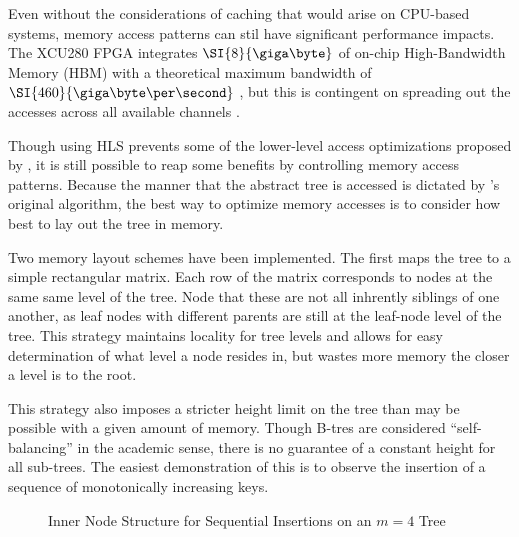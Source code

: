 \begin{figure}[H]
	\centering
	
\end{figure}

\begin{figure}[H]
	\centering
	
\end{figure}



Even without the considerations of caching that would arise on CPU-based
systems, memory access patterns can stil have significant performance impacts.
The XCU280 FPGA integrates $\SI{8}{\giga\byte}$ of on-chip High-Bandwidth Memory
(HBM) with a theoretical maximum bandwidth of $\SI{460}{\giga\byte\per\second}$
\autocite{u280}, but this is contingent on spreading out the accesses across all
available channels \autocite{holzinger-ipdpsw-2021}.

Though using HLS prevents some of the lower-level access optimizations proposed
by \citeauthor{holzinger-ipdpsw-2021}, it is still possible to reap some
benefits by controlling memory access patterns. Because the manner that the
abstract tree is accessed is dictated by \citeauthor{b-link}'s original
algorithm, the best way to optimize memory accesses is to consider how best to
lay out the tree in memory.


\begin{figure}[H]
	\centering
	
\end{figure}

Two memory layout schemes have been implemented. The first maps the tree to a
simple rectangular matrix. Each row of the matrix corresponds to nodes at the
same same level of the tree. Node that these are not all inhrently siblings of
one another, as leaf nodes with different parents are still at the leaf-node
level of the tree. This strategy maintains locality for tree levels and allows
for easy determination of what level a node resides in, but wastes more memory
the closer a level is to the root.

This strategy also imposes a stricter height limit on the tree than may be
possible with a given amount of memory. Though B-tres are considered
``self-balancing'' in the academic sense, there is no guarantee of a constant
height for all sub-trees. The easiest demonstration of this is to observe the
insertion of a sequence of monotonically increasing keys.

\begin{figure}[H]
	\centering
	
	\caption{Inner Node Structure for Sequential Insertions on an $m=4$ Tree}
\end{figure}
